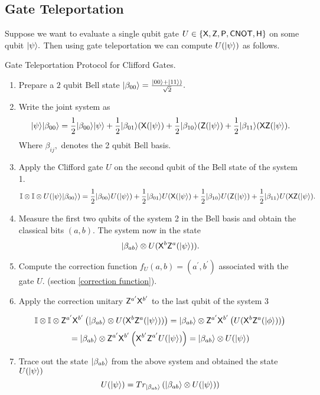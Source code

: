 \subsection{Gate Teleportation}
\label{protocol: gate  teleportation}
Suppose we want to evaluate a single qubit gate $U\in\{{\sf X}, {\sf Z}, {\sf P}, {\sf CNOT},{\sf H}\}$ on some qubit ${\lvert}\psi\rangle.$ Then using gate teleportation we can compute $U ({\lvert}\psi\rangle)$ as follows.
\begin{algorithm}[H]
\caption{Gate Teleportation Protocol for Clifford Gates.}
\begin{enumerate}
\item  Prepare a $2$ qubit Bell state ${\lvert}\beta_{00}\rangle=\frac{{\lvert}00\rangle+{\lvert}11\rangle)}{\sqrt{2}}.$
\item Write the joint system as
 \begin{equation}
{\lvert}\psi\rangle {\lvert}\beta_{00}\rangle=\frac{1}{2}{\lvert}\beta_{00}\rangle {\lvert}\psi\rangle+ \frac{1}{2}{\lvert}\beta_{01}\rangle( {\sf X}( {\lvert}\psi\rangle) + \frac{1}{2}{\lvert}\beta_{10}\rangle( {\sf Z}( {\lvert}\psi\rangle)+ \frac{1}{2}{\lvert}\beta_{11}\rangle( {\sf X} {\sf Z}( {\lvert}\psi\rangle).
\end{equation}
 Where $\beta_{ij},$  denotes the 2 qubit Bell basis.
\item Apply the Clifford gate $U$ on the second qubit of the Bell state of the system 1.
 \begin{equation}
\mathbb{I}\otimes \mathbb{I} \otimes U ({\lvert}\psi\rangle {\lvert}\beta_{00}\rangle)=\frac{1}{2}{\lvert}\beta_{00}\rangle U({\lvert}\psi\rangle)+ \frac{1}{2}{\lvert}\beta_{01}\rangle U( {\sf X}( {\lvert}\psi\rangle) + \frac{1}{2}{\lvert}\beta_{10}\rangle U( {\sf Z}( {\lvert}\psi\rangle)+ \frac{1}{2}{\lvert}\beta_{11}\rangle U( {\sf X} {\sf Z}( {\lvert}\psi\rangle).
 \end{equation}
 \item Measure the first two qubits of the system 2 in the Bell basis and obtain the classical bits $(a,b).$ The system now in the state
 \begin{equation}
							{\lvert}\beta_{ab}\rangle\otimes U( {\sf X}^b {\sf Z}^a( {\lvert}\psi\rangle)).
\end{equation}
\item Compute the correction function $f_U(a,b)=(a^\prime,b^\prime)$ associated with the gate $U.$ (section \ref{correction function}).
\item Apply the correction unitary $ {\sf Z}^{a^\prime}  {\sf X}^{b^\prime}$ to the last qubit of the system 3

$$\mathbb{I}\otimes \mathbb{I}\otimes  {\sf Z}^{a^\prime}  {\sf X}^{b^\prime} \left({\lvert}\beta_{ab}\rangle\otimes U( {\sf X}^b {\sf Z}^a( {\lvert}\psi\rangle))\right)= {\lvert}\beta_{ab}\rangle\otimes  {\sf Z}^{a^\prime}  {\sf X}^{b^\prime}\left(U( {\sf X}^b {\sf Z}^a( {\lvert}\phi\rangle))\right)$$
$$= {\lvert}\beta_{ab}\rangle\otimes  {\sf Z}^{a^\prime}  {\sf X}^{b^\prime} \left({\sf X}^{b^\prime} {\sf Z}^{a^\prime} U( {\lvert}\psi\rangle)\right)={\lvert}\beta_{ab}\rangle\otimes U( {\lvert}\psi\rangle)$$
\item Trace out the state ${\lvert}\beta_{ab}\rangle$ from the above system and obtained the state $U( {\lvert}\psi\rangle)$
$$U( {\lvert}\psi\rangle)=Tr_{{\lvert}\beta_{ab}\rangle}\left( {\lvert}\beta_{ab}\rangle\otimes U({\lvert}\psi\rangle)\right)$$

\end{enumerate}	
\end{algorithm}	


